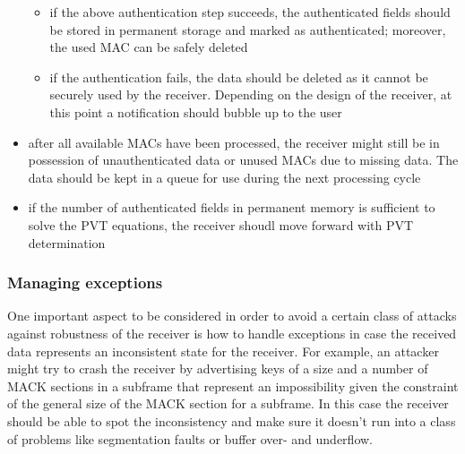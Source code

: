 \begin{itemize}
\begin{itemize}
      \item if the above authentication step succeeds, the authenticated fields
        should be stored in permanent storage and marked as authenticated;
        moreover, the used MAC can be safely deleted
      \item if the authentication fails, the data should be deleted as it cannot
        be securely used by the receiver. Depending on the design of the
        receiver, at this point a notification should bubble up to the user
    \end{itemize}
  \item after all available MACs have been processed, the receiver might still
    be in possession of unauthenticated data or unused MACs due to missing data.
    The data should be kept in a queue for use during the next processing cycle
  \item if the number of authenticated fields in permanent memory is sufficient
    to solve the PVT equations, the receiver shoudl move forward with PVT
    determination
\end{itemize}

\subsubsection{Managing exceptions}
One important aspect to be considered in order to avoid a certain class of
attacks against robustness of the receiver is how to handle exceptions in case
the received data represents an inconsistent state for the receiver. For
example, an attacker might try to crash the receiver by advertising keys of a
size and a number of MACK sections in a subframe that represent an impossibility
given the constraint of the general size of the MACK section for a subframe. In
this case the receiver should be able to spot the inconsistency and make sure it
doesn't run into a class of problems like segmentation faults or buffer over-
and underflow.

